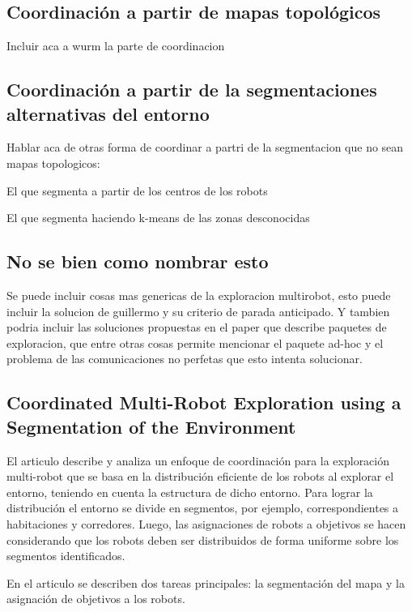 \subsection{Coordinación a partir de mapas topológicos}
Incluir aca a wurm la parte de coordinacion

\subsection{Coordinación a partir de la segmentaciones alternativas del entorno}
Hablar aca de otras forma de coordinar a partri de la segmentacion que no sean mapas topologicos:

El que segmenta a partir de los centros de los robots

El que segmenta haciendo k-means de las zonas desconocidas

\subsection{No se bien como nombrar esto}
Se puede incluir cosas mas genericas de la exploracion multirobot, esto puede incluir la solucion de guillermo y su criterio de parada anticipado. Y tambien podria incluir las soluciones propuestas en el paper que describe paquetes de exploracion, que entre otras cosas permite mencionar el paquete ad-hoc y el problema de las comunicaciones no perfetas que esto intenta solucionar.

\subsection[Coordinated Multi-Robot Exploration using a Segmentation of the Environment]{Coordinated Multi-Robot Exploration using a\\ Segmentation of the Environment}

\cite{wurm2008coordinated}
El articulo describe y analiza un enfoque de coordinación para la exploración multi-robot que se basa en la distribución eficiente de los robots al explorar el entorno, teniendo en cuenta la estructura de dicho entorno. Para lograr la distribución el entorno se divide en segmentos, por ejemplo, correspondientes a habitaciones y corredores. Luego, las asignaciones de robots a objetivos se hacen considerando que los robots deben ser distribuidos de forma uniforme sobre los segmentos identificados. 

En el articulo se describen dos tareas principales: la segmentación del mapa y la asignación de objetivos a los robots.

